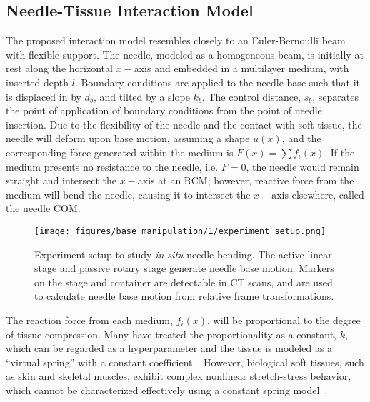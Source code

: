 \subsection{Needle-Tissue Interaction Model}
\label{sec:chap-3-needle-tissue-interaction-model}

The proposed interaction model resembles closely to an Euler-Bernoulli beam with flexible support.  The needle, modeled as a homogeneous beam, is initially at rest along the horizontal $x-$axis and embedded in a multilayer medium, with inserted depth $l$. Boundary conditions are applied to the needle base such that it is displaced in by $d_b$, and tilted by a slope $k_b$. The control distance, $s_b$, separates the point of application of boundary conditions from the point of needle insertion. Due to the flexibility of the needle and the contact with soft tissue, the needle will deform upon base motion, assuming a shape $u(x)$, and the corresponding force generated within the medium is $F(x) = \sum f_i(x)$. If the medium presents no resistance to the needle, i.e. $F = 0$, the needle would remain straight and intersect the $x-$axis at an RCM; however, reactive force from the medium will bend the needle, causing it to intersect the $x-$axis elsewhere, called the needle COM.

\begin{figure}[t]
  \centering
  \texttt{[image: figures/base\_manipulation/1/experiment\_setup.png]}
  \caption{Experiment setup to study \textit{in situ} needle bending. The active linear stage and passive rotary stage generate needle base motion. Markers on the stage and container are detectable in CT scans, and are used to calculate needle base motion from relative frame transformations.}
  \label{fig:chap-3-experiment-setup}
\end{figure}

The reaction force from each medium, $f_i(x)$, will be proportional to the degree of tissue compression. Many have treated the proportionality as a constant, $k$, which can be regarded as a hyperparameter and the tissue is modeled as a ``virtual spring'' with a constant coefficient~\parencite{glozmanImageGuidedRoboticFlexible2007}. However, biological soft tissues, such as skin and skeletal muscles, exhibit complex nonlinear stretch-stress behavior, which cannot be characterized effectively using a constant spring model~\parencite{humphreyIntroductionBiomechanicsSolids2025}.

